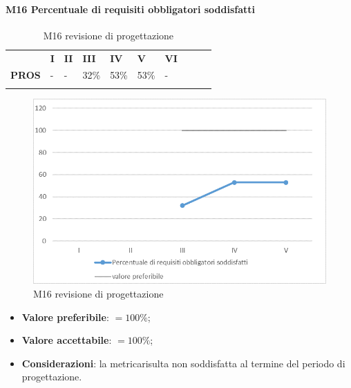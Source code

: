 \paragraph{M16 Percentuale di requisiti obbligatori soddisfatti} \mbox{}
\begin{longtable}[H!] {						
		>{}p{50mm}  		
		>{}p{8mm}
		>{}p{8mm}		
		>{}p{8mm}		
		>{}p{8mm}		
		>{}p{8mm}		
		>{}p{8mm}
		>{}p{8mm}
		>{}p{8mm}
		>{}p{8mm}
	}
	\rowcolor{gray!50}
	\textbf{} & \textbf{I} & \textbf{II} & \textbf{III} & \textbf{IV} & \textbf{V} & \textbf{VI} \TBstrut \\ [2mm]
	\textbf{PROS} & - & - & 32\% & 53\% & 53\% & - \TBstrut \\ [2mm]
	\rowcolor{white}
	\caption{M16 revisione di progettazione\glo}
\end{longtable}
\begin{figure}[H] 	
\includegraphics[width=\linewidth]{./img/grafici/RP13.png}	
\caption{M16 revisione di progettazione\glo}	
\end{figure}
\begin{itemize}
	\item \textbf{Valore preferibile}: $=100\%$;
	\item \textbf{Valore accettabile}: $=100\%$;
	\item \textbf{Considerazioni}: la metrica\glosp risulta non soddisfatta al termine del periodo di progettazione\glo.
\end{itemize}
